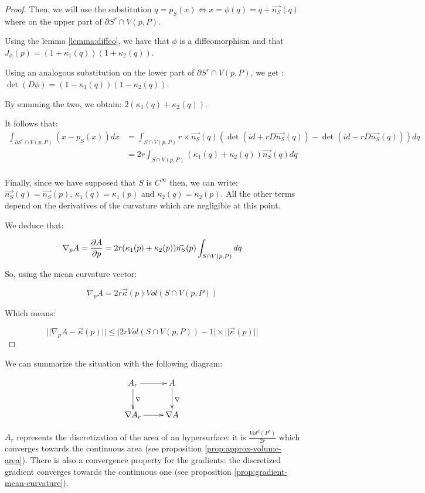 \begin{proof}
Then, we will use the substitution $ q = p_S(x) \iff x = \phi(q) = q +
\vec{n_S}(q) $ where on the upper part of $ \partial{S^r} \cap V(p, P) $.

Using the lemma \ref{lemma:diffeo}, we have that $ \phi $ is a diffeomorphism
and that $ J_\phi(p) = (1 + \kappa_1(q)) (1 + \kappa_2(q)) $.

Using an analogous substitution on the lower part of $ \partial{S^r} \cap V(p,
P) $, we get : $ \det (D \phi) = (1 - \kappa_1(q)) (1 - \kappa_2(q)) $.

By summing the two, we obtain: $ 2 (\kappa_1(q) + \kappa_2(q)) $.

It follows that:
\begin{align*}
    \int_{\partial{S^r} \cap V(p, P)} (x - p_S(x)) dx &= \int_{S \cap V(p, P)}
    r \times \vec{n_S}(q) ( \det (id + r D \vec{n_S}(q)) - \det (id - r D
    \vec{n_S}(q)) ) dq \\
    &= 2r \int_{S \cap V(p, P)} (\kappa_1(q) + \kappa_2(q)) \vec{n_S}(q) dq \\
\end{align*}

Finally, since we have supposed that $ S $ is $ C^{\infty} $ then, we can write:
$ \vec{n_S}(q) = \vec{n_S}(p) $, $ \kappa_1(q) = \kappa_1(p) $ and $ \kappa_2(q)
= \kappa_2(p) $. All the other terms depend on the derivatives of the curvature
which are negligible at this point.

We deduce that:

$$ \nabla_p A = \frac{\partial{A}}{\partial{p}} = 2r (\kappa_1(p) + \kappa_2(p)) \vec{n_S}(p)
\int_{S \cap V(p, P)} dq $$

So, using the mean curvature vector:

$$ \nabla_p A = 2r \vec{\kappa}(p) Vol(S \cap V(p, P)) $$

Which means:

$$ ||\nabla_p A - \vec{\kappa}(p) || \leq | 2r Vol(S \cap V(p, P)) - 1 |
\times|| \vec{\kappa}(p) ||$$

\end{proof}

We can summarize the situation with the following diagram:

\begin{displaymath}
    \xymatrix{A_r \ar[d]^{\nabla} \ar[r] & A \ar[d]^{\nabla} \\
        \nabla A_r \ar[r] & \nabla A }
\end{displaymath}

$ A_r $ represents the discretization of the area of an hypersurface: it
is $ \frac{Vol^d(P^r)}{2r} $ which converges towards the continuous area (see
proposition \ref{prop:approx-volume-area}). There is also a convergence property
for the gradients: the discretized gradient converges towards the continuous one
(see proposition \ref{prop:gradient-mean-curvature}).

